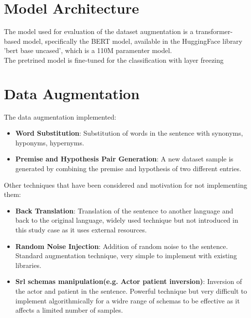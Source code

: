 \documentclass[11pt,a4paper]{article}
\begin{document}
\section{Model Architecture}
The model used for evaluation of the dataset augmentation is a transformer-based model, specifically the BERT model, available in the HuggingFace library
'bert base uncased', which is a 110M paramenter model.
\\The pretrined model is fine-tuned for the classification with layer freezing

\section{Data Augmentation}
The data augmentation implemented:
\sloppy
\begin{itemize}
    \item \textbf{Word Substitution}: Substitution of words in the sentence with synonyms, hyponyms, hypernyms.
    \item \textbf{Premise and Hypothesis Pair Generation}: A new dataset sample is generated by combining the premise and hypothesis of two different entries.
\end{itemize}

Other techniques that have been considered and motivation for not implementing them:
\begin{itemize}
    \item \textbf{Back Translation}: Translation of the sentence to another language and back to the original language, widely used technique but not introduced in this study case as it uses external resources.
    \item \textbf{Random Noise Injection}: Addition of random noise to the sentence. Standard augmentation technique, very simple to implement with existing libraries.
    \item \textbf{Srl schemas manipulation(e.g. Actor patient inversion)}: Inversion of the actor and patient in the sentence. Powerful technique but very difficult to implement algorithmically for a widre range of schemas to be effective as it affects a limited number of samples.
\end{itemize}
\end{document}
